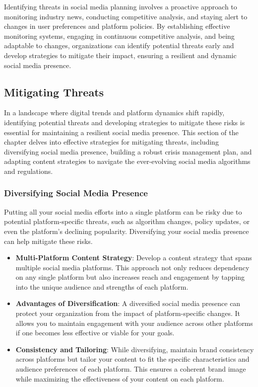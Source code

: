 \documentclass[
]{book}
\providecommand{\tightlist}{%
  \setlength{\itemsep}{0pt}\setlength{\parskip}{0pt}}
\begin{document}
Identifying threats in social media planning involves a proactive approach to monitoring industry news, conducting competitive analysis, and staying alert to changes in user preferences and platform policies. By establishing effective monitoring systems, engaging in continuous competitive analysis, and being adaptable to changes, organizations can identify potential threats early and develop strategies to mitigate their impact, ensuring a resilient and dynamic social media presence.

\hypertarget{mitigating-threats}{%
\subsection*{Mitigating Threats}\label{mitigating-threats}}

In a landscape where digital trends and platform dynamics shift rapidly, identifying potential threats and developing strategies to mitigate these risks is essential for maintaining a resilient social media presence. This section of the chapter delves into effective strategies for mitigating threats, including diversifying social media presence, building a robust crisis management plan, and adapting content strategies to navigate the ever-evolving social media algorithms and regulations.

\hypertarget{diversifying-social-media-presence}{%
\subsubsection*{Diversifying Social Media Presence}\label{diversifying-social-media-presence}}

Putting all your social media efforts into a single platform can be risky due to potential platform-specific threats, such as algorithm changes, policy updates, or even the platform's declining popularity. Diversifying your social media presence can help mitigate these risks.

\begin{itemize}
\tightlist
\item
  \textbf{Multi-Platform Content Strategy}: Develop a content strategy that spans multiple social media platforms. This approach not only reduces dependency on any single platform but also increases reach and engagement by tapping into the unique audience and strengths of each platform.
\item
  \textbf{Advantages of Diversification}: A diversified social media presence can protect your organization from the impact of platform-specific changes. It allows you to maintain engagement with your audience across other platforms if one becomes less effective or viable for your goals.
\item
  \textbf{Consistency and Tailoring}: While diversifying, maintain brand consistency across platforms but tailor your content to fit the specific characteristics and audience preferences of each platform. This ensures a coherent brand image while maximizing the effectiveness of your content on each platform.
\end{itemize}
\end{document}

